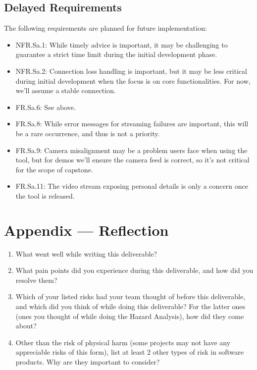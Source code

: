\documentclass{article}
\begin{document}
\subsection{Delayed Requirements}\label{subsec:delayed-requirements}
The following requirements are planned for future implementation:
\begin{itemize}
    \item NFR.Sa.1: While timely advice is important, it may be challenging to guarantee a strict time limit during the initial development phase.
    \item NFR.Sa.2: Connection loss handling is important, but it may be less critical during initial development when the focus is on core functionalities.
          For now, we'll assume a stable connection.
    \item FR.Sa.6: See above.
    \item FR.Sa.8: While error messages for streaming failures are important, this will be a rare occurrence, and thus is not a priority.
    \item FR.Sa.9: Camera misalignment may be a problem users face when using the tool, but for demos we'll ensure the camera feed is correct, so it's not critical for the scope of capstone.
    \item FR.Sa.11: The video stream exposing personal details is only a concern once the tool is released.
\end{itemize}


\newpage{}

\section*{Appendix --- Reflection}


% 

\begin{enumerate}
    \item What went well while writing this deliverable? 
    \item What pain points did you experience during this deliverable, and how
    did you resolve them?
    \item Which of your listed risks had your team thought of before this
    deliverable, and which did you think of while doing this deliverable? For
    the latter ones (ones you thought of while doing the Hazard Analysis), how
    did they come about?
    \item Other than the risk of physical harm (some projects may not have any
    appreciable risks of this form), list at least 2 other types of risk in
    software products. Why are they important to consider?
\end{enumerate}
\end{document}
